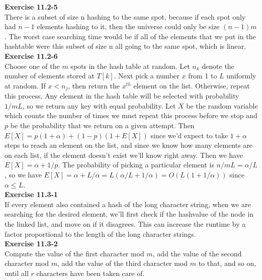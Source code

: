 \documentclass{article}
\begin{document}
\noindent\textbf{ Exercise 11.2-5} \\

There is a subset of size n hashing to the same spot, because if each spot only had $n-1$ elements hashing to it, then the universe could only be size $(n-1)m$. The worst case searching time would be if all of the elements that we put in the hashtable were this subset of size n all going to the same spot, which is linear. \\

\noindent\textbf{Exercise 11.2-6}\\ 

Choose one of the $m$ spots in the hash table at random.  Let $n_k$ denote the number of elements stored at $T[k]$. Next pick a number $x$ from 1 to $L$ uniformly at random. If $x < n_j$, then return the $x^{th}$ element on the list.  Otherwise, repeat this process.  Any element in the hash table will be selected with probability $1/mL$, so we return any key with equal probability.  Let $X$ be the random variable which counts the number of times we must repeat this process before we stop and $p$ be the probability that we return on a given attempt.  Then $E[X] = p(1+\alpha) + (1-p)(1 +E[X])$ since we'd expect to take $1 + \alpha$ steps to reach an element on the list, and since we know how many elements are on each list, if the element doesn't exist we'll know right away. Then we have $E[X] = \alpha + 1/p$.  The probability of picking a particular element is $n/mL = \alpha/L$, so we have $E[X] = \alpha + L/\alpha = L(\alpha/L + 1/\alpha) = O(L(1 + 1/\alpha))$ since $\alpha \leq L$. \\



\noindent\textbf{ Exercise 11.3-1} \\

If every element also contained a hash of the long character string, when we are searching for the desired element, we'll first check if the hashvalue of the node in the linked list, and move on if it disagrees. This can increase the runtime by a factor proportional to the length of the long character strings.\\

\noindent\textbf{Exercise 11.3-2}\\

Compute the value of the first character mod $m$, add the value of the second character mod $m$, add the value of the third character mod $m$ to that, and so on, until all $r$ characters have been taken care of.   \\
\end{document}
